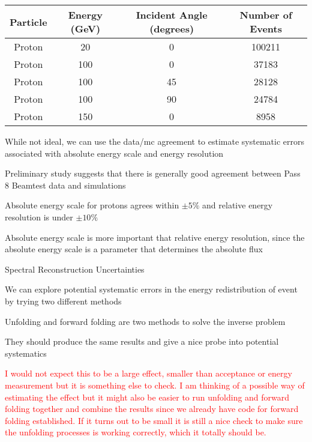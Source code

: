 \documentclass{article}
\begin{document}
\begin{myEnumerate}
\begin{myEnumerate}
\begin{myEnumerate}
\begin{myEnumerate}
  \begin{tabular}{| c | c | c | c |}
    \hline
    Particle & Energy (GeV) & Incident Angle (degrees) & Number of Events \\ \hline
    Proton & 20 & 0 & 100211 \\ \hline
    Proton & 100 & 0 & 37183 \\ \hline
    Proton & 100 & 45 & 28128 \\ \hline
    Proton & 100 & 90 & 24784 \\ \hline
    Proton & 150 & 0  & 8958\\ \hline
  \end{tabular}
  					\item While not ideal, we can use the data/mc agreement to estimate systematic errors associated with absolute energy scale and energy resolution
  					\item Preliminary study suggests that there is generally good agreement between Pass 8 Beamtest data and simulations
  					\item Absolute energy scale for protons agrees within $\pm 5\%$ and relative energy resolution is under $\pm 10\%$
  					\item Absolute energy scale is more important that relative energy resolution, since the absolute energy scale is a parameter that determines the absolute flux
				\end{myEnumerate}
			\end{myEnumerate}
			\item Spectral Reconstruction Uncertainties
			\begin{myEnumerate}
				\item We can explore potential systematic errors in the energy redistribution of event by trying two different methods
				\item Unfolding and forward folding are two methods to solve the inverse problem
				\item They should produce the same results and give a nice probe into potential systematics
				\item \textcolor{red}{I would not expect this to be a large effect, smaller than acceptance or energy measurement but it is something else to check.  I am thinking of a possible way of estimating the effect but it might also be easier to run unfolding and forward folding together and combine the results since we already have code for forward folding established.  If it turns out to be small it is still a nice check to make sure the unfolding processes is working correctly, which it totally should be.}
			\end{myEnumerate}
		\end{myEnumerate}
	\end{myEnumerate}
\end{document}

